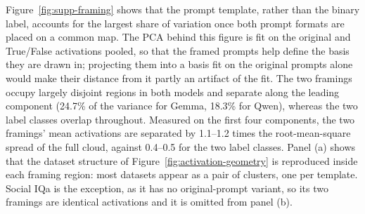 %
%



Figure~\ref{fig:supp-framing} shows that the prompt template, rather than the
binary label, accounts for the largest share of variation once both prompt
formats are placed on a common map. The PCA behind this figure is fit on the
original and True/False activations pooled, so that the framed prompts help
define the basis they are drawn in; projecting them into a basis fit on the
original prompts alone would make their distance from it partly an artifact of
the fit. The two framings occupy largely disjoint regions in both models and
separate along the leading component (24.7\% of the variance for Gemma, 18.3\%
for Qwen), whereas the two label classes overlap throughout. Measured on the
first four components, the two framings' mean activations are separated by
1.1--1.2 times the root-mean-square spread of the full cloud, against 0.4--0.5
for the two label classes. Panel (a) shows that the dataset structure of
Figure~\ref{fig:activation-geometry} is reproduced inside each framing region:
most datasets appear as a pair of clusters, one per template. Social IQa is the
exception, as it has no original-prompt variant, so its two framings are
identical activations and it is omitted from panel (b).

